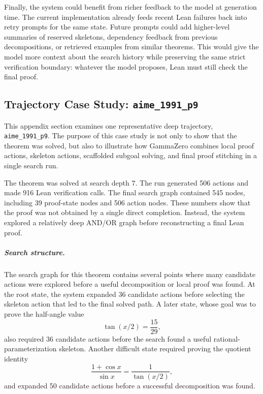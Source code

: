 \documentclass[en]{uet_awesome_thesis/uet-awesome-thesis}
\begin{document}
Finally, the system could benefit from richer feedback to the model at generation time. The current
implementation already feeds recent Lean failures back into retry prompts for the same state. Future
prompts could add higher-level summaries of reserved skeletons, dependency feedback from previous
decompositions, or retrieved examples from similar theorems. This would give the model more context
about the search history while preserving the same strict verification boundary: whatever the model
proposes, Lean must still check the final proof.

\singlespacing
\clearpage
{}



\begin{appendices}

\chapter{Trajectory Case Study: \texttt{aime\_1991\_p9}}
\label{app:case-study-aime-1991-p9}

This appendix section examines one representative deep trajectory, \texttt{aime\_1991\_p9}. The purpose
of this case study is not only to show that the theorem was solved, but also to illustrate how GammaZero
combines local proof actions, skeleton actions, scaffolded subgoal solving, and final proof stitching in a
single search run.

The theorem was solved at search depth 7. The run generated 506 actions and made 916 Lean verification
calls. The final search graph contained 545 nodes, including 39 proof-state nodes and 506 action nodes.
These numbers show that the proof was not obtained by a single direct completion. Instead, the system
explored a relatively deep AND/OR graph before reconstructing a final Lean proof.

\paragraph{Search structure.}
The search graph for this theorem contains several points where many candidate actions were explored before a useful decomposition or local proof was found. At the root state, the system expanded 36 candidate actions before selecting the skeleton action that led to the final solved path. A later state, whose goal was to prove the half-angle value
\[
\tan(x/2) = \frac{15}{29},
\]
also required 36 candidate actions before the search found a useful rational-parameterization skeleton. Another difficult state required proving the quotient identity
\[
\frac{1+\cos x}{\sin x} = \frac{1}{\tan(x/2)},
\]
and expanded 50 candidate actions before a successful decomposition was found.


\end{appendices}
\end{document}
